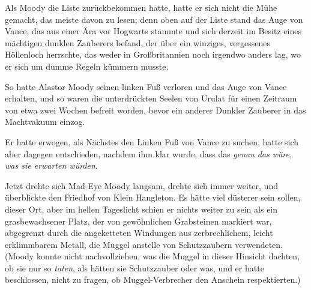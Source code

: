Als Moody die Liste zurückbekommen hatte, hatte er sich nicht die Mühe gemacht, das meiste davon zu lesen; denn oben auf der Liste stand das Auge von Vance, das aus einer Ära vor Hogwarts stammte und sich derzeit im Besitz eines mächtigen dunklen Zauberers befand, der über ein winziges, vergessenes Höllenloch herrschte, das weder in Großbritannien noch irgendwo anders lag, wo er sich um dumme Regeln kümmern musste.

So hatte Alastor Moody seinen linken Fuß verloren und das Auge von Vance erhalten, und so waren die unterdrückten Seelen von Urulat für einen Zeitraum von etwa zwei Wochen befreit worden, bevor ein anderer Dunkler Zauberer in das Machtvakuum einzog.

Er hatte erwogen, als Nächstes den Linken Fuß von Vance zu suchen, hatte sich aber dagegen entschieden, nachdem ihm klar wurde, dass das \emph{genau das wäre, was sie erwarten würden}.

Jetzt drehte sich Mad-Eye Moody langsam, drehte sich immer weiter, und überblickte den Friedhof von Klein Hangleton. Es hätte viel düsterer sein sollen, dieser Ort, aber im hellen Tageslicht schien er nichts weiter zu sein als ein grasbewachsener Platz, der von gewöhnlichen Grabsteinen markiert war, abgegrenzt durch die angeketteten Windungen aus zerbrechlichem, leicht erklimmbarem Metall, die Muggel anstelle von Schutzzaubern verwendeten. (Moody konnte nicht nachvollziehen, was die Muggel in dieser Hinsicht dachten, ob sie nur so \emph{taten}, als hätten sie Schutzzauber oder was, und er hatte beschlossen, nicht zu fragen, ob Muggel-Verbrecher den Anschein respektierten.)

